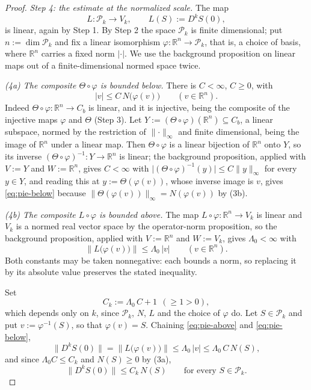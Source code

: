 \begin{proof}
\medskip\noindent\emph{Step 4: the estimate at the normalized scale.}
The map
\[
  L\colon\mathcal{P}_k\to V_k,\qquad L(S):=D^{k}S(0),
\]
is linear, again by Step 1.  By Step 2 the space $\mathcal{P}_k$ is finite dimensional; put
$n:=\dim\mathcal{P}_k$ and fix a linear isomorphism $\varphi\colon\mathbb{R}^{n}\to\mathcal{P}_k$,
that is, a choice of basis, where $\mathbb{R}^{n}$ carries a fixed norm $\lvert\cdot\rvert$.  We
use the background proposition on linear maps out of a finite-dimensional normed space twice.

\emph{(4a) The composite $\Theta\circ\varphi$ is bounded below.}  There is $C<\infty$, $C\ge0$,
with
\begin{equation}\label{eq:pie-below}
  \lvert v\rvert\le C\,N\bigl(\varphi(v)\bigr)\qquad(v\in\mathbb{R}^{n}).
\end{equation}
Indeed $\Theta\circ\varphi\colon\mathbb{R}^{n}\to C_b$ is linear, and it is injective, being the
composite of the injective maps $\varphi$ and $\Theta$ (Step 3).  Let
$Y:=(\Theta\circ\varphi)(\mathbb{R}^{n})\subseteq C_b$, a linear subspace, normed by the
restriction of $\lVert\cdot\rVert_\infty$ and finite dimensional, being the image of
$\mathbb{R}^{n}$ under a linear map.  Then $\Theta\circ\varphi$ is a linear bijection of
$\mathbb{R}^{n}$ onto $Y$, so its inverse $(\Theta\circ\varphi)^{-1}\colon Y\to\mathbb{R}^{n}$ is
linear; the background proposition, applied with $V:=Y$ and $W:=\mathbb{R}^{n}$, gives $C<\infty$
with $\lvert(\Theta\circ\varphi)^{-1}(y)\rvert\le C\lVert y\rVert_\infty$ for every $y\in Y$, and
reading this at $y:=\Theta(\varphi(v))$, whose inverse image is $v$, gives \eqref{eq:pie-below}
because $\lVert\Theta(\varphi(v))\rVert_\infty=N(\varphi(v))$ by (3b).

\emph{(4b) The composite $L\circ\varphi$ is bounded above.}  The map
$L\circ\varphi\colon\mathbb{R}^{n}\to V_k$ is linear and $V_k$ is a normed real vector space by
the operator-norm proposition, so the background proposition, applied with $V:=\mathbb{R}^{n}$
and $W:=V_k$, gives $\Lambda_0<\infty$ with
\begin{equation}\label{eq:pie-above}
  \bigl\lVert L\bigl(\varphi(v)\bigr)\bigr\rVert\le\Lambda_0\,\lvert v\rvert
  \qquad(v\in\mathbb{R}^{n}).
\end{equation}
Both constants may be taken nonnegative: each bounds a norm, so replacing it by its absolute
value preserves the stated inequality.

Set
\[
  C_k:=\Lambda_0\,C+1\ \ (\ge1>0) ,
\]
which depends only on $k$, since $\mathcal{P}_k$, $N$, $L$ and the choice of $\varphi$ do.  Let
$S\in\mathcal{P}_k$ and put $v:=\varphi^{-1}(S)$, so that $\varphi(v)=S$.  Chaining
\eqref{eq:pie-above} and \eqref{eq:pie-below},
\[
  \bigl\lVert D^{k}S(0)\bigr\rVert=\bigl\lVert L\bigl(\varphi(v)\bigr)\bigr\rVert
  \le\Lambda_0\,\lvert v\rvert\le\Lambda_0\,C\,N(S) ,
\]
and since $\Lambda_0 C\le C_k$ and $N(S)\ge0$ by (3a),
\begin{equation}\label{eq:pie-norm}
  \bigl\lVert D^{k}S(0)\bigr\rVert\le C_k\,N(S)\qquad\text{for every }S\in\mathcal{P}_k.
\end{equation}


\end{proof}
